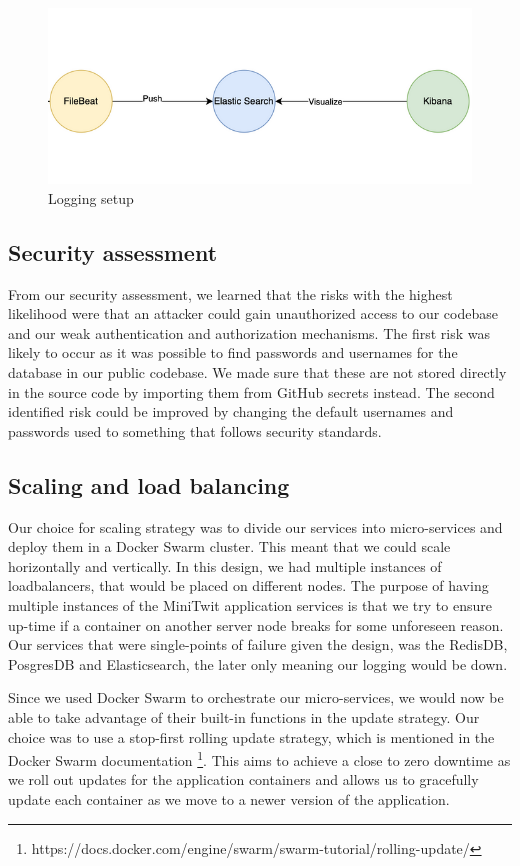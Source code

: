 \begin{figure}[H]
    \centering
    \captionsetup{justification=centering,margin=1cm}
    \includegraphics[width=0.8\linewidth]{report/images/logging.png}
    \caption{Logging setup}
    \label{fig:logging}
\end{figure}

\subsection{Security assessment}
From our security assessment, we learned that the risks with the highest likelihood were that an attacker could gain unauthorized access to our codebase
and our weak authentication and authorization mechanisms. The first risk was likely to occur as it was possible to find passwords and usernames for the database 
in our public codebase. We made sure that these are not stored directly in the source code by importing them from GitHub secrets instead. The second identified 
risk could be improved by changing the default usernames and passwords used to something that follows security standards.  

\subsection{Scaling and load balancing}

Our choice for scaling strategy was to divide our services into micro-services and deploy them in a Docker Swarm cluster. This meant that we could scale horizontally and vertically. In this design, we had multiple instances of loadbalancers, that would be placed on different nodes. The purpose of having multiple instances of the MiniTwit application services is that we try to ensure up-time if a container on another server node breaks for some unforeseen reason. Our services that were single-points of failure given the design, was the RedisDB, PosgresDB and Elasticsearch, the later only meaning our logging would be down. 

Since we used Docker Swarm to orchestrate our micro-services, we would now be able to take advantage of their built-in functions in the update strategy. Our choice was to use a stop-first rolling update strategy, which is mentioned in the Docker
Swarm documentation \footnote{https://docs.docker.com/engine/swarm/swarm-tutorial/rolling-update/}. This aims to achieve a close to zero downtime as we roll out updates for the application containers and allows us to gracefully update each container as we move to a newer version of the application.

